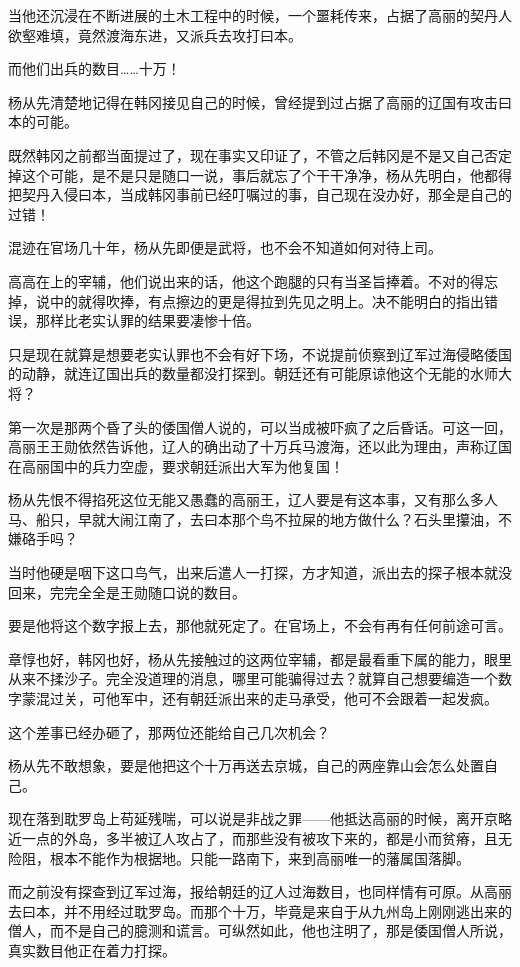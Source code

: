 当他还沉浸在不断进展的土木工程中的时候，一个噩耗传来，占据了高丽的契丹人欲壑难填，竟然渡海东进，又派兵去攻打曰本。

而他们出兵的数目……十万！

杨从先清楚地记得在韩冈接见自己的时候，曾经提到过占据了高丽的辽国有攻击曰本的可能。

既然韩冈之前都当面提过了，现在事实又印证了，不管之后韩冈是不是又自己否定掉这个可能，是不是只是随口一说，事后就忘了个干干净净，杨从先明白，他都得把契丹入侵曰本，当成韩冈事前已经叮嘱过的事，自己现在没办好，那全是自己的过错！

混迹在官场几十年，杨从先即便是武将，也不会不知道如何对待上司。

高高在上的宰辅，他们说出来的话，他这个跑腿的只有当圣旨捧着。不对的得忘掉，说中的就得吹捧，有点擦边的更是得拉到先见之明上。决不能明白的指出错误，那样比老实认罪的结果要凄惨十倍。

只是现在就算是想要老实认罪也不会有好下场，不说提前侦察到辽军过海侵略倭国的动静，就连辽国出兵的数量都没打探到。朝廷还有可能原谅他这个无能的水师大将？

第一次是那两个昏了头的倭国僧人说的，可以当成被吓疯了之后昏话。可这一回，高丽王王勋依然告诉他，辽人的确出动了十万兵马渡海，还以此为理由，声称辽国在高丽国中的兵力空虚，要求朝廷派出大军为他复国！

杨从先恨不得掐死这位无能又愚蠢的高丽王，辽人要是有这本事，又有那么多人马、船只，早就大闹江南了，去曰本那个鸟不拉屎的地方做什么？石头里攥油，不嫌硌手吗？

当时他硬是咽下这口鸟气，出来后遣人一打探，方才知道，派出去的探子根本就没回来，完完全全是王勋随口说的数目。

要是他将这个数字报上去，那他就死定了。在官场上，不会有再有任何前途可言。

章惇也好，韩冈也好，杨从先接触过的这两位宰辅，都是最看重下属的能力，眼里从来不揉沙子。完全没道理的消息，哪里可能骗得过去？就算自己想要编造一个数字蒙混过关，可他军中，还有朝廷派出来的走马承受，他可不会跟着一起发疯。

这个差事已经办砸了，那两位还能给自己几次机会？

杨从先不敢想象，要是他把这个十万再送去京城，自己的两座靠山会怎么处置自己。

现在落到耽罗岛上苟延残喘，可以说是非战之罪——他抵达高丽的时候，离开京略近一点的外岛，多半被辽人攻占了，而那些没有被攻下来的，都是小而贫瘠，且无险阻，根本不能作为根据地。只能一路南下，来到高丽唯一的藩属国落脚。

而之前没有探查到辽军过海，报给朝廷的辽人过海数目，也同样情有可原。从高丽去曰本，并不用经过耽罗岛。而那个十万，毕竟是来自于从九州岛上刚刚逃出来的僧人，而不是自己的臆测和谎言。可纵然如此，他也注明了，那是倭国僧人所说，真实数目他正在着力打探。

